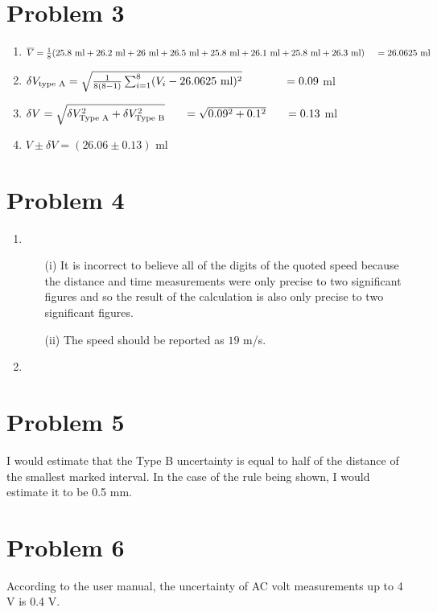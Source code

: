 \documentclass[12pt]{article}
\begin{document}
    \section*{Problem 3}
    \begin{enumerate}
        \item \(\overline{V} = \frac{1}{8}(25.8\text{ ml} + 26.2\text{ ml} + 26\text{ ml} + 26.5\text{ ml} + 25.8\text{ ml} + 26.1\text{ ml} + 25.8\text{ ml} + 26.3\text{ ml})\\~~~\,= 26.0625\text{ ml}\)
        \item \(\delta V_{\text{type A}} = \sqrt{\frac{1}{8(8-1)}\sum_{i=1}^{8}(V_i-26.0625\text{ ml})^2}\\~~~~\quad\quad~=0.09\) ml
        \item \(\delta V = \sqrt{\delta V^2_\text{Type A} + \delta V^2_\text{Type B}}\\~~~~~=\sqrt{0.09^2 + 0.1^2}\\~~~~~=0.13\) ml
        \item \(V\pm\delta V = (26.06\pm0.13)\) ml
    \end{enumerate}

    \section*{Problem 4}
    \begin{enumerate}
        \item \begin{enumerate}
            \item[(i)] It is incorrect to believe all of the digits of the quoted speed because the distance and time measurements were only precise to two significant figures and so the result of the calculation is also only precise to two significant figures.
            \item[(ii)] The speed should be reported as \(19\) m/s.
        \end{enumerate}
        \item 
    \end{enumerate}

    \section*{Problem 5}
    I would estimate that the Type B uncertainty is equal to half of the distance of the smallest marked interval. In the case of the rule being shown, I would estimate it to be 0.5 mm.

    \section*{Problem 6}
    According to the user manual, the uncertainty of AC volt measurements up to 4 V is 0.4 V.
\end{document}
